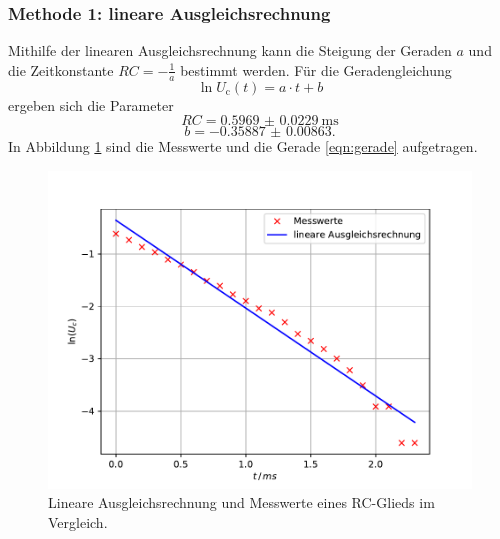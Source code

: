 \subsubsection{Methode 1: lineare Ausgleichsrechnung}
Mithilfe der linearen Ausgleichsrechnung kann die Steigung der Geraden $a$ und die Zeitkonstante $RC=-\frac{1}{a}$ bestimmt werden.
Für die Geradengleichung
\begin{equation}
    \ln U_\text{c}(t) = a \cdot t + b
    \label{eqn:gerade}
\end{equation}
ergeben sich die Parameter
\begin{equation*}
    RC = \SI{0.5969(229)}{\milli\second}
\end{equation*}
\begin{equation*}
    b = \SI{-0.35887(863)} .
\end{equation*}
In Abbildung \ref{fig:plota} sind die Messwerte und die Gerade \ref{eqn:gerade} aufgetragen.
\begin{figure}
    \centering
    \includegraphics[width=\textwidth]{content/data/plota.pdf}
    \caption{Lineare Ausgleichsrechnung und Messwerte eines RC-Glieds im Vergleich.}
    \label{fig:plota}
\end{figure}

